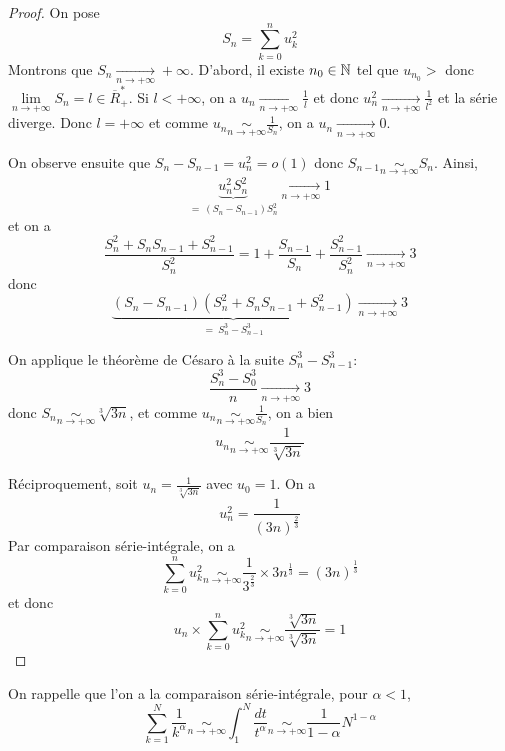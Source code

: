 \begin{proof}
	On pose 
	$$S_{n}=\sum_{k=0}^{n}u_{k}^{2}$$
	Montrons que $S_{n}\xrightarrow[n\to+\infty]{}+\infty$. D'abord, il existe $n_{0}\in\mathbb{N}$ tel que $u_{n_{0}}>$ donc $\lim\limits_{n\to+\infty}S_{n}=l\in\overline{R}_{+}^{*}$. Si $l<+\infty$, on a $u_{n}\xrightarrow[n\to+\infty]{}\frac{1}{l}$ et donc $u_{n}^{2}\xrightarrow[n\to+\infty]{}\frac{1}{l^{2}}$ et la série diverge. Donc $l=+\infty$ et comme $u_{n}\underset{n\to+\infty}{\sim}\frac{1}{S_{n}}$, on a $u_{n}\xrightarrow[n\to+\infty]{}0$.

	On observe ensuite que $S_{n}-S_{n-1}=u_{n}^{2}=o(1)$ donc $S_{n-1}\underset{n\to+\infty}{\sim}S_{n}$. Ainsi, 
	$$\underbrace{u_{n}^{2}S_{n}^{2}}_{=~(S_{n}-S_{n-1})S_{n}^{2}}\xrightarrow[n\to+\infty]{}1$$
	et on a 
	$$\frac{S_{n}^{2}+S_{n}S_{n-1}+S_{n-1}^{2}}{S_{n}^{2}}=1+\frac{S_{n-1}}{S_{n}}+\frac{S_{n-1}^{2}}{S_{n}^{2}}\xrightarrow[n\to+\infty]{}3$$
	donc 
	$$\underbrace{(S_{n}-S_{n-1})(S_{n}^{2}+S_{n}S_{n-1}+S_{n-1}^{2})}_{=~S_{n}^{3}-S_{n-1}^{3}}\xrightarrow[n\to+\infty]{}3$$

	On applique le théorème de Césaro à la suite $S_{n}^{3}-S_{n-1}^{3}$:
	$$\frac{S_{n}^{3}-S_{0}^{3}}{n}\xrightarrow[n\to+\infty]{}3$$
	donc $S_{n}\underset{n\to+\infty}{\sim}\sqrt[3]{3n}$, et comme $u_{n}\underset{n\to+\infty}{\sim}\frac{1}{S_{n}}$, on a bien 
	$$\boxed{u_{n}\underset{n\to+\infty}{\sim}\frac{1}{\sqrt[3]{3n}}}$$

	Réciproquement, soit $u_{n}=\frac{1}{\sqrt[3]{3n}}$ avec $u_{0}=1$. On a 
	$$u_{n}^{2}=\frac{1}{(3n)^{\frac{2}{3}}}$$
	Par comparaison série-intégrale, on a 
	$$\sum_{k=0}^{n}u_{k}^{2}\underset{n\to+\infty}{\sim}\frac{1}{3^{\frac{2}{3}}}\times 3n^{\frac{1}{3}}=(3n)^{\frac{1}{3}}$$
	et donc 
	$$\boxed{u_{n}\times\sum_{k=0}^{n}u_{k}^{2}\underset{n\to+\infty}{\sim}\frac{\sqrt[3]{3n}}{\sqrt[3]{3n}}=1}$$
\end{proof}

\begin{remark}
	On rappelle que l'on a la comparaison série-intégrale, pour $\alpha<1$,
	$$\sum_{k=1}^{N}\frac{1}{k^{\alpha}}\underset{n\to+\infty}{\sim}\int_{1}^{N}\frac{dt}{t^{\alpha}}\underset{n\to+\infty}{\sim}\frac{1}{1-\alpha}N^{1-\alpha}$$
\end{remark}

